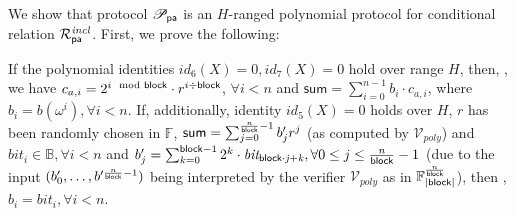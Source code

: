 \noindent We show that protocol $\mathscr{P}_{\mathsf{pa}}$ is an $H$-ranged polynomial protocol 
for conditional relation $\mathcal{R}^{\mathit{incl}}_{\mathsf{pa}}$. First, we prove the following:

\begin{claim} If the polynomial identities $id_6(X) = 0, id_7(X) = 0$ hold over range $H$, then, 
\ewnp, 
we have $c_{a,i} =  2^{i \mod {\mathsf{block}}} \cdot r^{i \div \mathsf{block}}$, $\forall i < n$ and $\mathsf{sum} = \sum_{i=0}^{n-1}b_i \cdot c_{a,i}$, 
where $b_i = b(\omega^i), \forall i <n$. If, additionally, identity $id_5(X) = 0$ holds over $H$, 
$r$ has been randomly chosen in $\mathbb{F}$, $\mathsf{sum} = \sum_{j=0}^{\frac{n}{\mathsf{block}}-1} b'_{j}r^j$ 
(as computed by $\mathcal{V}_{poly}$) and $\mathit{bit_{i}} \in \mathbb{B}, \forall i < n$ and 
$b'_{j} = \sum_{k=0}^{\mathsf{block} -1}2^k \cdot \mathit{bit_{\mathsf{block} \cdot j + k}}, \forall 0 \leq j \leq \frac{n}{\mathsf{block}} -1$ 
(due to the input $(b'_{0}, \ldots, b'^{\frac{n}{\mathsf{block}} -1})$ 
being interpreted by the verifier $\mathcal{V}_{poly}$ as in $\mathbb{F}_{|\mathsf{block}|}^{\frac{n}{\mathsf{block}}}$), then \ewnp, 
$b_i = \mathit{bit_{i}}, \forall i <n$.
\label{claim:bitvector_comm}
\end{claim}

